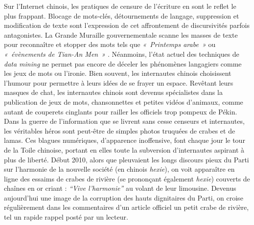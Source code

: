 Sur l’Internet chinois, les pratiques de censure de l’écriture en sont le reflet le plus frappant. Blocage de mots-clés, détournements de langage, suppression et modification de texte sont l’expression de cet affrontement de discursivités parfois antagonistes. La Grande Muraille gouvernementale scanne les masses de texte pour reconnaître et stopper des mots tels que \textit{« Printemps arabe »} ou \textit{« évènements de Tian-An Men »} \citep{MacKinnon2012}. Néanmoins, l’état actuel des techniques de \textit{data mining} ne permet pas encore de déceler les phénomènes langagiers comme les jeux de mots ou l’ironie. Bien souvent, les internautes chinois choisissent l’humour pour permettre à leurs idées de se frayer un espace. Revêtant leurs masques de chat, les internautes chinois sont devenus spécialistes dans la publication de jeux de mots, chansonnettes et petites vidéos d’animaux, comme autant de couperets cinglants pour railler les officiels trop pompeux de Pékin. Dans la guerre de l’information que se livrent sans cesse censeurs et internautes, les véritables héros sont peut-être de simples photos truquées de crabes et de lamas. Ces blagues numériques, d’apparence inoffensive, font chaque jour le tour de la Toile chinoise, portant en elles toute la subversion d’internautes aspirant à plus de liberté. Début 2010, alors que pleuvaient les longs discours pieux du Parti sur l’harmonie de la nouvelle société (en chinois \textit{hexie}), on voit apparaître en ligne des essaims de crabes de rivière (se prononçant également \textit{hexie}) couverts de chaînes en or criant : \textit{“Vive l’harmonie”} au volant de leur limousine. Devenus aujourd’hui une image de la corruption des hauts dignitaires du Parti, on croise régulièrement dans les commentaires d’un article officiel un petit crabe de rivière, tel un rapide rappel posté par un lecteur.


